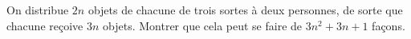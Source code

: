 On distribue $2n$ objets de chacune de trois sortes à deux personnes, de sorte que chacune reçoive $3n$ objets. Montrer que cela peut se faire de $3n^2 + 3n + 1$ façons.
